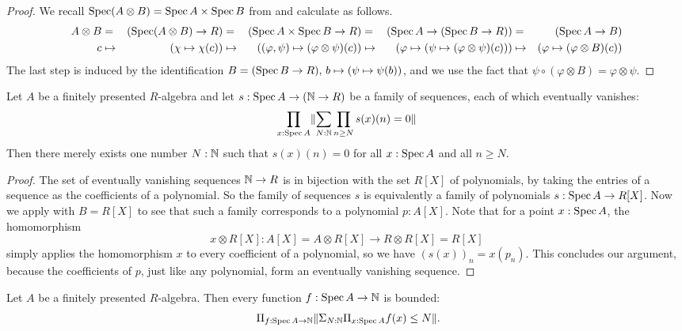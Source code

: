 \begin{proof}
  We recall $\operatorname{Spec} (A \otimes B) = \operatorname{Spec} A \times \operatorname{Spec} B$
  from 
  and calculate as follows.
  \begin{alignat*}{8}
    A \otimes B
    &=& (\operatorname{Spec} (A \otimes B) \to R)
    &=& (\operatorname{Spec} A \times \operatorname{Spec} B \to R)
    &=& (\operatorname{Spec} A \to (\operatorname{Spec} B \to R))
    &=& (\operatorname{Spec} A \to B) \\
    c
    &\mapsto& (\chi \mapsto \chi(c))
    &\mapsto& ((\varphi, \psi) \mapsto (\varphi \otimes \psi)(c))
    &\mapsto& (\varphi \mapsto (\psi \mapsto (\varphi \otimes \psi)(c)))
    &\mapsto& (\varphi \mapsto (\varphi \otimes B)(c))
  \end{alignat*}
  The last step is induced by the identification
  $B = (\operatorname{Spec} B \to R),\, b \mapsto (\psi \mapsto \psi(b))$,
  and we use the fact that
  $\psi \circ (\varphi \otimes B) = \varphi \otimes \psi$.
\end{proof}

\begin{lemma}%
  \label{eventually-vanishing-sequence-on-affine}
  Let $A$ be a finitely presented $R$-algebra
  and let $s : \operatorname{Spec} A \to (\mathbb{N} \to R)$
  be a family of sequences,
  each of which eventually vanishes:
  \[ \prod_{x : \operatorname{Spec} A} \lVert \sum_{N : \mathbb{N}} \prod_{n \geq N} s(x)(n) = 0 \rVert \]
  Then there merely exists one number $N : \mathbb{N}$
  such that $s(x)(n) = 0$ for all $x : \operatorname{Spec} A$ and all $n \geq N$.
\end{lemma}

\begin{proof}
  The set of eventually vanishing sequences $\mathbb{N} \to R$
  is in bijection with the set $R[X]$ of polynomials,
  by taking the entries of a sequence as the coefficients of a polynomial.
  So the family of sequences $s$
  is equivalently a family of polynomials $s : \operatorname{Spec} A \to R[X]$.
  Now we apply  with $B = R[X]$
  to see that such a family corresponds to a polynomial $p : A[X]$.
  Note that for a point $x : \operatorname{Spec} A$,
  the homomorphism
  \[ x \otimes R[X] : A[X] = A \otimes R[X] \to R \otimes R[X] = R[X] \]
  simply applies the homomorphism $x$ to every coefficient of a polynomial,
  so we have $(s(x))_n = x(p_n)$.
  This concludes our argument,
  because the coefficients of $p$,
  just like any polynomial,
  form an eventually vanishing sequence.
\end{proof}

\begin{theorem}%
  \label{boundedness}
  Let $A$ be a finitely presented $R$-algebra.
  Then every function $f : \operatorname{Spec} A \to \mathbb{N}$ is bounded:
  \[ \Pi_{f : \Spec A \to \N} \propTrunc{\Sigma_{N : \N} \Pi_{x : \Spec A} f(x) \le N}
     \rlap{.} \]
\end{theorem}

